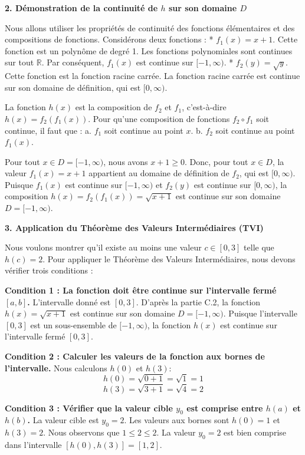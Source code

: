 \documentclass[12pt,a4paper]{report}
\begin{document}
\textbf{2. Démonstration de la continuité de $h$ sur son domaine $D$}

Nous allons utiliser les propriétés de continuité des fonctions élémentaires et des compositions de fonctions.
Considérons deux fonctions :
*   $f_1(x) = x+1$. Cette fonction est un polynôme de degré 1. Les fonctions polynomiales sont continues sur tout $\mathbb{R}$. Par conséquent, $f_1(x)$ est continue sur $[-1, \infty)$.
*   $f_2(y) = \sqrt{y}$. Cette fonction est la fonction racine carrée. La fonction racine carrée est continue sur son domaine de définition, qui est $[0, \infty)$.

La fonction $h(x)$ est la composition de $f_2$ et $f_1$, c'est-à-dire $h(x) = f_2(f_1(x))$.
Pour qu'une composition de fonctions $f_2 \circ f_1$ soit continue, il faut que :
a.  $f_1$ soit continue au point $x$.
b.  $f_2$ soit continue au point $f_1(x)$.

Pour tout $x \in D = [-1, \infty)$, nous avons $x+1 \ge 0$.
Donc, pour tout $x \in D$, la valeur $f_1(x) = x+1$ appartient au domaine de définition de $f_2$, qui est $[0, \infty)$.
Puisque $f_1(x)$ est continue sur $[-1, \infty)$ et $f_2(y)$ est continue sur $[0, \infty)$, la composition $h(x) = f_2(f_1(x)) = \sqrt{x+1}$ est continue sur son domaine $D = [-1, \infty)$.

\textbf{3. Application du Théorème des Valeurs Intermédiaires (TVI)}

Nous voulons montrer qu'il existe au moins une valeur $c \in [0, 3]$ telle que $h(c) = 2$.
Pour appliquer le Théorème des Valeurs Intermédiaires, nous devons vérifier trois conditions :

\textbf{Condition 1 : La fonction doit être continue sur l'intervalle fermé $[a, b]$.}
L'intervalle donné est $[0, 3]$.
D'après la partie C.2, la fonction $h(x) = \sqrt{x+1}$ est continue sur son domaine $D = [-1, \infty)$.
Puisque l'intervalle $[0, 3]$ est un sous-ensemble de $[-1, \infty)$, la fonction $h(x)$ est continue sur l'intervalle fermé $[0, 3]$.

\textbf{Condition 2 : Calculer les valeurs de la fonction aux bornes de l'intervalle.}
Nous calculons $h(0)$ et $h(3)$:
$$ h(0) = \sqrt{0+1} = \sqrt{1} = 1 $$
$$ h(3) = \sqrt{3+1} = \sqrt{4} = 2 $$

\textbf{Condition 3 : Vérifier que la valeur cible $y_0$ est comprise entre $h(a)$ et $h(b)$.}
La valeur cible est $y_0 = 2$.
Les valeurs aux bornes sont $h(0) = 1$ et $h(3) = 2$.
Nous observons que $1 \le 2 \le 2$.
La valeur $y_0 = 2$ est bien comprise dans l'intervalle $[h(0), h(3)] = [1, 2]$.
\end{document}
